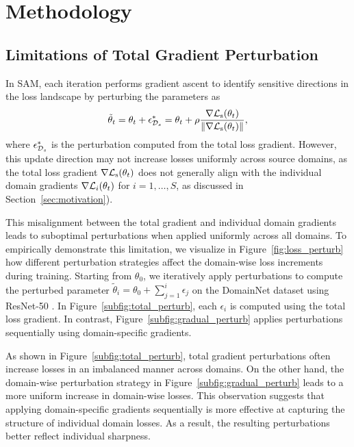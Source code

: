 \documentclass{article}
\theoremstyle{plain}
\theoremstyle{definition}
\theoremstyle{remark}
\begin{document}
\section{Methodology}

\subsection{Limitations of Total Gradient Perturbation}\label{subsec:grad-failure}

In SAM, each iteration performs gradient ascent to identify sensitive directions in the loss landscape by perturbing the parameters as
\begin{align}
\tilde{\theta}_t = \theta_t + \epsilon^*_{{\mathcal{D}}_s} = \theta_t + \rho \frac{\nabla {\mathcal{L}}_{\text{s}}(\theta_t)}{\|\nabla {\mathcal{L}}_{\text{s}}(\theta_t)\|}, \label{eq:perturb_total}
\end{align}
where $\epsilon^*_{{\mathcal{D}}_s}$ is the perturbation computed from the total loss gradient. However, this update direction may not increase losses uniformly across source domains, as the total loss gradient $\nabla {\mathcal{L}}_{\text{s}}(\theta_t)$ does not generally align with the individual domain gradients $\nabla {\mathcal{L}}_{i}(\theta_t)$ for $i = 1,\ldots, S$, as discussed in Section~\ref{sec:motivation}).

This misalignment between the total gradient and individual domain gradients leads to suboptimal perturbations when applied uniformly across all domains. To empirically demonstrate this limitation, we visualize in Figure~\ref{fig:loss_perturb} how different perturbation strategies affect the domain-wise loss increments during training. Starting from $\theta_0$, we iteratively apply perturbations to compute the perturbed parameter $\tilde{\theta}_i = \theta_0 + \sum_{j=1}^{i} \epsilon_j$ on the DomainNet dataset \citep{peng2019domainnet} using ResNet-50 \citep{he2016resnet}. In Figure~\ref{subfig:total_perturb}, each $\epsilon_i$ is computed using the total loss gradient. In contrast, Figure~\ref{subfig:gradual_perturb} applies perturbations sequentially using domain-specific gradients.

As shown in Figure~\ref{subfig:total_perturb}, total gradient perturbations often increase losses in an imbalanced manner across domains. On the other hand, the domain-wise perturbation strategy in Figure~\ref{subfig:gradual_perturb} leads to a more uniform increase in domain-wise losses. This observation suggests that applying domain-specific gradients sequentially is more effective at capturing the structure of individual domain losses. As a result, the resulting perturbations better reflect individual sharpness.
\end{document}
